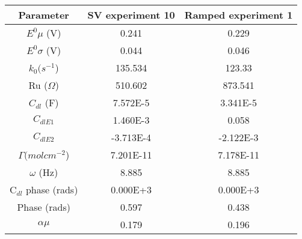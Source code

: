 \documentclass[preview]{standalone}
\begin{document}
\begin{center}
\begin{tabular}{|c|c|c|}
\hline
Parameter & SV experiment 10 & Ramped experiment 1\\
\hline\hline
$E^0 \mu$ (V) & 0.241 & 0.229 \\
\hline
$E^0 \sigma$ (V) & 0.044 & 0.046 \\
\hline
$k_0 (s^{-1}$) & 135.534 & 123.33 \\
\hline
Ru ($\Omega$) & 510.602 & 873.541 \\
\hline
$C_{dl}$ (F) & 7.572E-5 & 3.341E-5 \\
\hline
$C_{dlE1}$& 1.460E-3 & 0.058 \\
\hline
$C_{dlE2}$& -3.713E-4 & -2.122E-3 \\
\hline
$\Gamma (mol cm^{-2}$) & 7.201E-11 & 7.178E-11 \\
\hline
$\omega$ (Hz) & 8.885 & 8.885 \\
\hline
C$_{dl}$ phase (rads) & 0.000E+3 & 0.000E+3 \\
\hline
Phase (rads) & 0.597 & 0.438 \\
\hline
$\alpha\mu$& 0.179 & 0.196 \\
\hline
\end{tabular}
\end{center}
\end{document}
